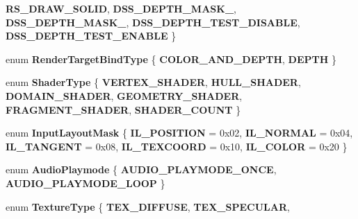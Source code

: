 \begin{DoxyCompactItemize}
{\bfseries R\+S\+\_\+\+D\+R\+A\+W\+\_\+\+S\+O\+L\+ID}, 
{\bfseries D\+S\+S\+\_\+\+D\+E\+P\+T\+H\+\_\+\+M\+A\+S\+K\+\_}, 
\newline
{\bfseries D\+S\+S\+\_\+\+D\+E\+P\+T\+H\+\_\+\+M\+A\+S\+K\+\_}, 
{\bfseries D\+S\+S\+\_\+\+D\+E\+P\+T\+H\+\_\+\+T\+E\+S\+T\+\_\+\+D\+I\+S\+A\+B\+LE}, 
{\bfseries D\+S\+S\+\_\+\+D\+E\+P\+T\+H\+\_\+\+T\+E\+S\+T\+\_\+\+E\+N\+A\+B\+LE}
 \}
\item 
\mbox{\label{namespace_blade_a51f1474ac426043fbd780671d4190b12}} 
enum {\bfseries Render\+Target\+Bind\+Type} \{ {\bfseries C\+O\+L\+O\+R\+\_\+\+A\+N\+D\+\_\+\+D\+E\+P\+TH}, 
{\bfseries D\+E\+P\+TH}
 \}
\item 
\mbox{\label{namespace_blade_ad4378fb4853380975f27c32df97c44b7}} 
enum {\bfseries Shader\+Type} \{ \newline
{\bfseries V\+E\+R\+T\+E\+X\+\_\+\+S\+H\+A\+D\+ER}, 
{\bfseries H\+U\+L\+L\+\_\+\+S\+H\+A\+D\+ER}, 
{\bfseries D\+O\+M\+A\+I\+N\+\_\+\+S\+H\+A\+D\+ER}, 
{\bfseries G\+E\+O\+M\+E\+T\+R\+Y\+\_\+\+S\+H\+A\+D\+ER}, 
\newline
{\bfseries F\+R\+A\+G\+M\+E\+N\+T\+\_\+\+S\+H\+A\+D\+ER}, 
{\bfseries S\+H\+A\+D\+E\+R\+\_\+\+C\+O\+U\+NT}
 \}
\item 
\mbox{\label{namespace_blade_ac58f1c7a28a59c0eb6a659b9387f2d23}} 
enum {\bfseries Input\+Layout\+Mask} \{ \newline
{\bfseries I\+L\+\_\+\+P\+O\+S\+I\+T\+I\+ON} = 0x02, 
{\bfseries I\+L\+\_\+\+N\+O\+R\+M\+AL} = 0x04, 
{\bfseries I\+L\+\_\+\+T\+A\+N\+G\+E\+NT} = 0x08, 
{\bfseries I\+L\+\_\+\+T\+E\+X\+C\+O\+O\+RD} = 0x10, 
\newline
{\bfseries I\+L\+\_\+\+C\+O\+L\+OR} = 0x20
 \}
\item 
\mbox{\label{namespace_blade_ade9e5a907d0d8150c597c75e73ccd74a}} 
enum {\bfseries Audio\+Playmode} \{ {\bfseries A\+U\+D\+I\+O\+\_\+\+P\+L\+A\+Y\+M\+O\+D\+E\+\_\+\+O\+N\+CE}, 
{\bfseries A\+U\+D\+I\+O\+\_\+\+P\+L\+A\+Y\+M\+O\+D\+E\+\_\+\+L\+O\+OP}
 \}
\item 
\mbox{\label{namespace_blade_a604b94f1fbd16acf9f04ef07a87afb88}} 
enum {\bfseries Texture\+Type} \{ \newline
{\bfseries T\+E\+X\+\_\+\+D\+I\+F\+F\+U\+SE}, 
{\bfseries T\+E\+X\+\_\+\+S\+P\+E\+C\+U\+L\+AR}, 

\end{DoxyCompactItemize}
